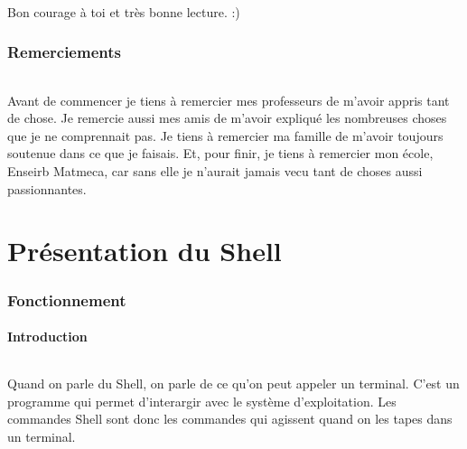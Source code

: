 \documentclass{article}
\begin{document}
\paragraph{}                     
Bon courage à toi et très bonne lecture. :)

\section{Remerciements}

\paragraph{}                     
Avant de commencer je tiens à remercier mes professeurs de m'avoir appris tant de chose. Je remercie aussi mes amis de m'avoir expliqu\'e les nombreuses choses que je ne comprennait pas. Je tiens à remercier ma famille de m'avoir toujours soutenue dans ce que je faisais. Et, pour finir, je tiens \`a remercier mon \'ecole, Enseirb Matmeca, car sans elle je n'aurait jamais vecu tant de choses aussi passionnantes.

\newpage



\part{Pr\'esentation du Shell}

\section{Fonctionnement}
\subsection{Introduction}

\paragraph{}                          
Quand on parle du Shell, on parle de ce qu'on peut appeler un terminal. C'est un programme qui permet d'interargir avec le syst\`eme d'exploitation. Les commandes Shell sont donc les commandes qui agissent quand on les tapes dans un terminal.
\end{document}
